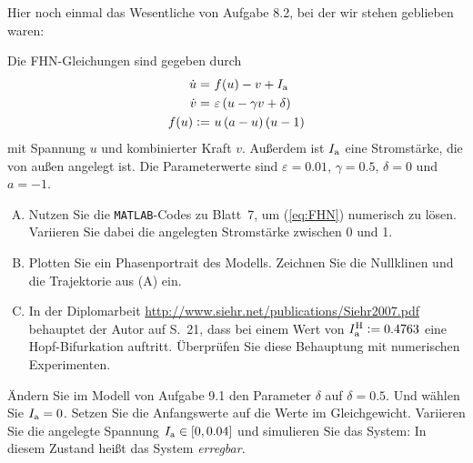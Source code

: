 \documentclass[11pt,a4paper]{article}
\begin{document}



\begin{aufg}
 Hier noch einmal das Wesentliche von Aufgabe 8.2, bei der wir stehen geblieben
 waren:

 Die FHN-Gleichungen sind gegeben durch
 \begin{align}
  \dot{u}      =&\ f(u) - v + I_{\rm a}\notag\\
  \dot{v}      =&\ \varepsilon \left(u - \gamma v + \delta\right)\label{eq:FHN}\\
  f(u) \coloneqq&\ u\left(a-u\right)\left(u-1\right)\notag
\end{align}
mit Spannung $u$ und kombinierter Kraft $v$.
Außerdem ist $I_{\rm a}$ eine Stromstärke, die von außen angelegt ist.
Die Parameterwerte sind $\varepsilon = 0.01$, $\gamma = 0.5$,
$\delta = 0$ und $a = -1$.

\begin{enumerate}[(A)]
 \item Nutzen Sie die \texttt{MATLAB}-Codes zu Blatt~7, um (\ref{eq:FHN})
       numerisch zu lösen. Variieren Sie dabei die angelegten Stromstärke
       zwischen 0 und 1.
 \item Plotten Sie ein Phasenportrait des Modells. Zeichnen Sie
       die Nullklinen und die Trajektorie aus (A) ein.
 \item In der Diplomarbeit \url{http://www.siehr.net/publications/Siehr2007.pdf}
       behauptet der Autor auf S.~21, dass bei einem Wert von
       $I_{\rm a}^{\rm H} \coloneqq 0.4763$ eine Hopf-Bifurkation auftritt.
       Überprüfen Sie diese Behauptung mit numerischen Experimenten.
\end{enumerate}
\end{aufg}

\bigskip%

\begin{aufg}
Ändern Sie im Modell von Aufgabe 9.1 den Parameter $\delta$ auf $\delta = 0.5$.
Und wählen Sie $I_{\rm a}=0$.
Setzen Sie die Anfangswerte auf die Werte im Gleichgewicht. Variieren Sie die
angelegte Spannung $I_{\rm a}\in [0,0.04]$ und simulieren Sie das System:
In diesem Zustand heißt das System \emph{erregbar}.
\end{aufg}
\end{document}

